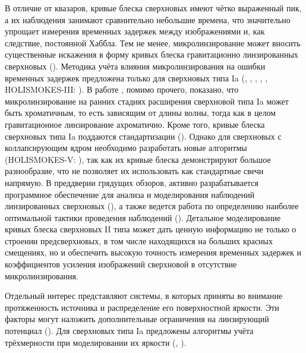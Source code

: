 В отличие от квазаров, кривые блеска сверхновых имеют чётко выраженный пик, а их наблюдения занимают сравнительно небольшие времена, что значительно упрощает измерения временных задержек между изображениями и, как следствие, постоянной Хаббла. Тем не менее, микролинзирование может вносить существенные искажения в форму кривых блеска гравитационно линзированных сверхновых (\cite{doblerkeeton2006}). Методика учёта влияния микролинзирования на ошибки временных задержек предложена только для сверхновых типа Ia (\cite{moresuyu2017}, \cite{yahalomi2017}, \cite{goldstein2018}, \cite{foxleymarrable2018}, \cite{bonvin2019}, HOLISMOKES-III: \cite{holismokesIII}). В работе \cite{goldstein2018}, помимо прочего, показано, что микролинзирование на ранних стадиях расширения сверхновой типа Ia может быть хроматичным, то есть зависящим от длины волны, тогда как в целом гравитационное линзирование ахроматично. Кроме того, кривые блеска сверхновых типа Ia поддаются стандартизации (\cite{1a_standart}). Однако для сверхновых с коллапсирующим ядром необходимо разработать новые алгоритмы (HOLISMOKES-V: \cite{holismokesV}), так как их кривые блеска демонстрируют большое разнообразие, что не позволяет их использовать как стандартные свечи напрямую. В преддверии грядущих обзоров, активно  разрабатывается  программное обеспечение для анализа и моделирования наблюдений линзированных сверхновых (\cite{pierelrodney2019}), а также ведется работа по определению наиболее оптимальной тактики проведения наблюдений (\cite{hubersuyu2019}). Детальное моделирование кривых блеска сверхновых II типа может дать ценную информацию не только о строении предсверхновых, в том числе находящихся на больших красных смещениях, но и обеспечить высокую точность измерения временных задержек и коэффициентов усиления изображений сверхновой в отсутствие микролинзирования.

Отдельный интерес представляют системы, в которых приняты во внимание протяженность источника и распределение его поверхностной яркости. Эти факторы могут наложить дополнительные ограничения на линзирующий потенциал (\cite{suyu2010}). Для сверхновых типа Ia предложены алгоритмы учёта трёхмерности при моделировании их яркости (\cite{bonvin2019}, \cite{hubersuyu2019}).

